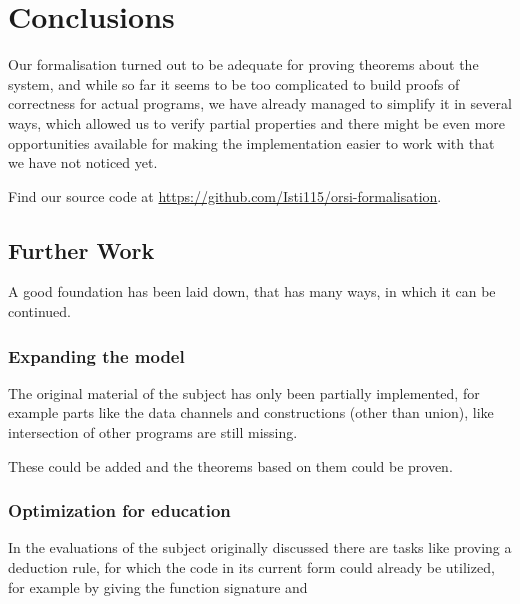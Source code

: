 \chapter{Conclusions}

Our formalisation turned out to be adequate for proving theorems about the system, and while so far it seems to be too complicated to build proofs of correctness for actual programs, we have already managed to simplify it in several ways, which allowed us to verify partial properties and there might be even more opportunities available for making the implementation easier to work with that we have not noticed yet.

Find our source code at \url{https://github.com/Isti115/orsi-formalisation}.

\section{Further Work}

A good foundation has been laid down, that has many ways, in which it can be continued.

\subsection{Expanding the model}

The original material of the subject has only been partially implemented, for example parts like the data channels and constructions (other than union), like intersection of other programs are still missing.

These could be added and the theorems based on them could be proven.

\subsection{Optimization for education}
In the evaluations of the subject originally discussed there are tasks like proving a deduction rule, for which the code in its current form could already be utilized, for example by giving the function signature and 


